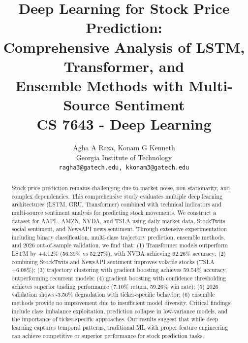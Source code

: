 \documentclass[10pt,twocolumn]{article}
\title{\textbf{Deep Learning for Stock Price Prediction:\\Comprehensive Analysis of LSTM, Transformer, and\\Ensemble Methods with Multi-Source Sentiment} \\[0.5em]
\large CS 7643 - Deep Learning}
\author{Agha A Raza, Konam G Kenneth \\
Georgia Institute of Technology \\
\texttt{ragha3@gatech.edu, kkonam3@gatech.edu}}
\date{}
\begin{document}
\maketitle

\begin{center}
\end{center}

\begin{abstract}
\small
Stock price prediction remains challenging due to market noise, non-stationarity, and complex dependencies. This comprehensive study evaluates multiple deep learning architectures (LSTM, GRU, Transformer) combined with technical indicators and multi-source sentiment analysis for predicting stock movements. We construct a dataset for AAPL, AMZN, NVDA, and TSLA using daily market data, StockTwits social sentiment, and NewsAPI news sentiment. Through extensive experimentation including binary classification, multi-class trajectory prediction, ensemble methods, and 2026 out-of-sample validation, we find that: (1) Transformer models outperform LSTM by +4.12\% (56.39\% vs 52.27\%), with NVDA achieving 62.26\% accuracy; (2) combining StockTwits and NewsAPI sentiment improves volatile stocks (TSLA +6.08\%); (3) trajectory clustering with gradient boosting achieves 59.54\% accuracy, outperforming recurrent models; (4) gradient boosting with confidence thresholding achieves superior trading performance (7.10\% return, 59.26\% win rate); (5) 2026 validation shows -3.56\% degradation with ticker-specific behavior; (6) ensemble methods provide no improvement due to insufficient model diversity. Critical findings include class imbalance exploitation, prediction collapse in low-variance models, and the importance of ticker-specific approaches. Our results suggest that while deep learning captures temporal patterns, traditional ML with proper feature engineering can achieve competitive or superior performance for stock prediction tasks.
\end{abstract}
\end{document}
